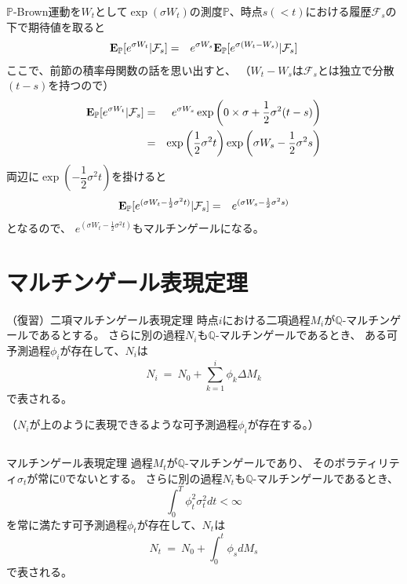 \documentclass[uplatex,a4j,12pt,dvipdfmx]{jsarticle}
\begin{document}
$\mathbb{P}$-Brown運動を$W_{t}$として$\exp(\sigma W_{t})$の測度$\mathbb{P}$、時点$s(<t)$における履歴$\mathcal{F}_{s}$の下で期待値を取ると
%
\begin{eqnarray*}
	{\bf E}_{\mathbb{P}}[ e^{\sigma W_{t}} | \mathcal{F}_{s} ]
	&=&
	e^{\sigma W_{s}}
		{\bf E}_{\mathbb{P}}[ e^{\sigma (W_{t} -W_{s})} | \mathcal{F}_{s} ]
\end{eqnarray*}
%
ここで、前節の積率母関数の話を思い出すと、
（$W_{t} - W_{s}$は$\mathcal{F}_{s}$とは独立で分散$(t-s)$を持つので）
%
\begin{eqnarray*}
	{\bf E}_{\mathbb{P}}[ e^{\sigma W_{t}} | \mathcal{F}_{s} ]
	&=&
	e^{\sigma W_{s}}
	\exp \left( 0 \times \sigma + \dfrac{1}{2} \sigma^{2} (t-s) \right)
	\\ &=&
	\exp \left( \dfrac{1}{2} \sigma^{2} t \right)
	\exp \left( \sigma W_{s} - \dfrac{1}{2} \sigma^{2} s \right)
\end{eqnarray*}
%
両辺に$\exp \left( - \dfrac{1}{2} \sigma^{2} t \right)$を掛けると
%
\begin{eqnarray*}
	{\bf E}_{\mathbb{P}}[ e^{ ( \sigma W_{t} - \frac{1}{2} \sigma^{2} t ) } | \mathcal{F}_{s} ]
	&=&
	e^{ ( \sigma W_{s} - \frac{1}{2} \sigma^{2} s ) }
\end{eqnarray*}
%
となるので、
$e^{ ( \sigma W_{t} - \frac{1}{2} \sigma^{2} t ) }$もマルチンゲールになる。
\section{マルチンゲール表現定理}
%
\begin{itembox}[l]{（復習）二項マルチンゲール表現定理}
	時点$i$における二項過程$M_{i}$が$\mathbb{Q}$-マルチンゲールであるとする。
	さらに別の過程$N_{i}$も$\mathbb{Q}$-マルチンゲールであるとき、
	ある可予測過程$\phi_{i}$が存在して、$N_{i}$は
	$$
		N_{i} \ = \ N_{0} + \sum_{k=1}^{i} \phi_{k} \Delta M_{k}
	$$
	で表される。

	（$N_{i}$が上のように表現できるような可予測過程$\phi_{i}$が存在する。）
\end{itembox}
%

${}$

%
\begin{itembox}[l]{マルチンゲール表現定理}
	過程$M_{t}$が$\mathbb{Q}$-マルチンゲールであり、
	そのボラティリティ$\sigma_{t}$が常に0でないとする。
	さらに別の過程$N_{t}$も$\mathbb{Q}$-マルチンゲールであるとき、
	$$
		\int^{T}_{0} \phi_{t}^{2} \sigma_{t}^{2} d t < \infty
	$$
	を常に満たす可予測過程$\phi_{t}$が存在して、$N_{t}$は
	$$
		N_{t} \ = \ N_{0} + \int^{t}_{0} \phi_{s} d M_{s}
	$$
	で表される。
\end{itembox}
%
\end{document}
